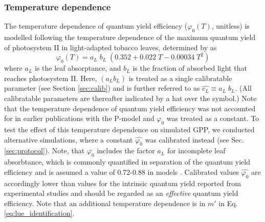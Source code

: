 \documentclass{myreport}
\begin{document}
\subsubsection{Temperature dependence}
\label{sec:tempstress}
The temperature dependence of quantum yield efficiency ($\varphi_0(T)$, unitless) is modelled following the temperature dependence of the maximum quantum yield of photosystem II in light-adapted tobacco leaves, determined by \cite{bernacchi03pce} as 
\begin{equation}
\varphi_0(T) = a_L \; b_L \; ( 0.352 + 0.022\;T - 0.00034\;T^2 )
\end{equation}
where $a_L$ is the leaf absorptance, and $b_L$ is the fraction of absorbed light that reaches photosystem II. Here, $(a_L b_L)$ is treated as a single calibratable parameter (see Section \ref{sec:calib}) and is further referred to as $\widehat{c_L}\equiv a_L\; b_L$. (All calibratable parameters are thereafter indicated by a hat over the symbol.) Note that the temperature dependence of quantum yield efficiency was not accounted for in earlier publications with the P-model \citep{keenan17natcomm, wang17natpl} and $\varphi_0$ was treated as a constant. To test the effect of this temperature dependence on simulated GPP, we conducted alternative simulations, where a constant $\widehat{\varphi_0}$ was calibrated instead (see Sec. \ref{sec:protocol}). Note, that $\varphi_0$  includes the factor $a_L$ for incomplete leaf absorbtance, which is commonly quantified in separation of the quantum yield efficiency and is assumed a value of 0.72-0.88 in models \citep{rogers17}. Calibrated values $\widehat{\varphi_0}$ are accordingly lower than values for the intrinsic quantum yield reported from experimental studies \citep{long93, singsaas01} and should be regarded as an \textit{effective} quantum yield efficiency. Note that an additional temperature dependence is in $m'$ in Eq. \ref{eq:lue_identification}.
\end{document}
